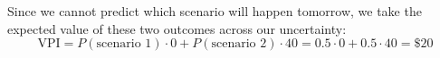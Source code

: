 Since we cannot predict which scenario will happen tomorrow, we take the expected value of these two outcomes across our  uncertainty:
\[
\text{VPI} = P(\text{scenario 1}) \cdot 0 + P(\text{scenario 2}) \cdot 40 = 0.5 \cdot 0 + 0.5 \cdot 40 = \$20
\]


\noindent{}